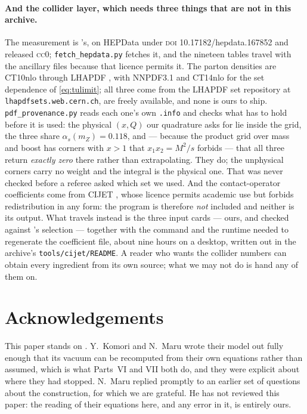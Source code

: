 \documentclass[11pt,a4paper]{article}
\begin{document}
\paragraph{And the collider layer, which needs three things that are not in this archive.} The
measurement is \cite{CMSangular}'s, on HEPData under \textsc{doi} 10.17182/hepdata.167852 and
released \textsc{cc0}; \texttt{fetch\_\allowbreak hepdata.py} fetches it, and the nineteen
tables travel with the ancillary files because that licence permits it. The parton densities are
CT10nlo \cite{CT10} through LHAPDF \cite{LHAPDF}, with NNPDF3.1 \cite{NNPDF31} and CT14nlo
\cite{CT14} for the set dependence of \eqref{eq:tulimit}; all three come from the LHAPDF set
repository at \texttt{lhapdfsets.web.cern.ch}, are freely available, and none is ours to ship.
\texttt{pdf\_\allowbreak provenance.py} reads each one's own \texttt{.info} and checks what has to
hold before it is used: the physical $(x,Q)$ our quadrature asks for lie inside the grid, the three
share $\alpha_s(m_Z)=0.118$, and --- because the product grid over mass and boost has corners with
$x>1$ that $x_1x_2=M^2/s$ forbids --- that all three return \emph{exactly zero} there rather than
extrapolating. They do; the unphysical corners carry no weight and the integral is the physical
one. That was never checked before a referee asked which set we used. And the contact-operator coefficients come from CIJET \cite{CIJET}, whose licence permits
academic use but forbids redistribution in any form: the program is therefore \emph{not} included
and neither is its output. What travels instead is the three input cards --- ours, and checked
against \cite{CMSangular}'s selection --- together with the command and the runtime needed to
regenerate the coefficient file, about nine hours on a desktop, written out in the archive's
\texttt{tools/cijet/README}. A reader who wants the collider numbers can obtain every ingredient
from its own source; what we may not do is hand any of them on.

\endgroup

\section*{Acknowledgements}

This paper stands on \cite{KM25}. Y.~Komori and N.~Maru wrote their model out fully enough that its
vacuum can be recomputed from their own equations rather than assumed, which is what Parts~VI and
VII both do, and they were explicit about where they had stopped. N.~Maru replied promptly to an
earlier set of questions about the construction, for which we are grateful. He has not reviewed this
paper: the reading of their equations here, and any error in it, is entirely ours.
\end{document}
